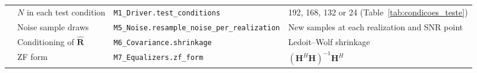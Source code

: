 \begin{table}[!ht]
\begin{tabular}{|p{2.3cm}|p{3.4cm}|p{4.3cm}|p{3.2cm}|}
\cline{2-4}
 & \raggedright $N$ in each test condition & \raggedright \texttt{M1\_\allowbreak{}Driver.\allowbreak test\_\allowbreak{}conditions} & \raggedright 192, 168, 132 or 24 (Table~\ref{tab:condicoes_teste}) \tabularnewline
\cline{2-4}
 & \raggedright Noise sample draws & \raggedright \texttt{M5\_\allowbreak{}Noise.\allowbreak resample\_\allowbreak{}noise\_\allowbreak{}per\_\allowbreak{}realization} & \raggedright New samples at each realization and SNR point \tabularnewline
\cline{2-4}
 & \raggedright Conditioning of $\hat{\mathbf{R}}$ & \raggedright \texttt{M6\_\allowbreak{}Covariance.\allowbreak shrinkage} & \raggedright Ledoit--Wolf shrinkage \tabularnewline
\cline{2-4}
 & \raggedright ZF form & \raggedright \texttt{M7\_\allowbreak{}Equalizers.\allowbreak zf\_\allowbreak{}form} & \raggedright $(\mathbf{H}^H\mathbf{H})^{-1}\mathbf{H}^H$ \tabularnewline
\bottomrule
\end{tabular}
\vspace{4pt}
\end{table}

